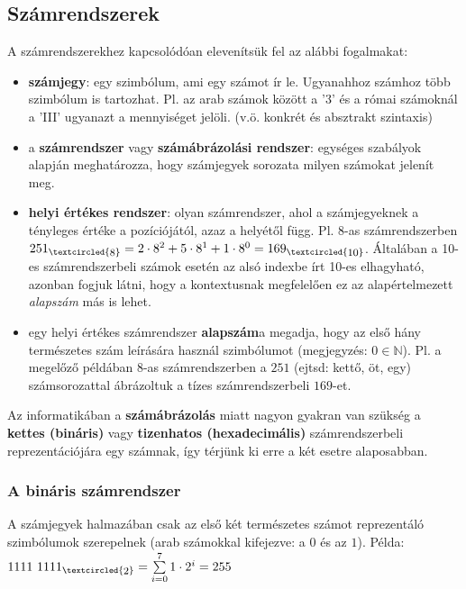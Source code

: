 \subsection{Számrendszerek}
A számrendszerekhez kapcsolódóan elevenítsük fel az alábbi fogalmakat:
\begin{itemize}
  \item \textbf{számjegy}: egy szimbólum, ami egy számot ír le. Ugyanahhoz számhoz több szimbólum is tartozhat. Pl. az arab számok között a '3' és a római számoknál a 'III' ugyanazt a mennyiséget jelöli. (v.ö. konkrét és absztrakt szintaxis)
  \item a \textbf{számrendszer} vagy \textbf{számábrázolási rendszer}: egységes szabályok alapján meghatározza, hogy számjegyek sorozata milyen számokat jelenít meg.
  \item \textbf{helyi értékes rendszer}: olyan számrendszer, ahol a számjegyeknek a tényleges értéke a pozíciójától, azaz a helyétől függ. Pl. 8-as számrendszerben $251_{\textcircled{\raisebox{-0.9pt}{\footnotesize{8}}}} =2 \cdot 8^2 + 5 \cdot 8^1 + 1 \cdot 8^0= 169_{\textcircled{\raisebox{-0.9pt}{\footnotesize{10}}}}$. Általában a 10-es számrendszerbeli számok esetén az alsó indexbe írt 10-es elhagyható, azonban fogjuk látni, hogy a kontextusnak megfelelően ez az alapértelmezett \textit{alapszám} más is lehet. 
  \item egy helyi értékes számrendszer \textbf{alapszám}a megadja, hogy az első hány természetes szám leírására használ szimbólumot (megjegyzés: $0 \in \mathbb{N}$). Pl. a megelőző példában 8-as számrendszerben a $251$ (ejtsd: kettő, öt, egy) számsorozattal ábrázoltuk a tízes számrendszerbeli $169$-et.
\end{itemize}
Az informatikában a \textbf{számábrázolás} miatt nagyon gyakran van szükség a \textbf{kettes (bináris)} vagy \textbf{tizenhatos (hexadecimális)} számrendszerbeli reprezentációjára egy számnak, így térjünk ki erre a két esetre alaposabban.

\subsubsection{A bináris számrendszer}
A számjegyek halmazában csak az első két természetes számot reprezentáló szimbólumok szerepelnek (arab számokkal kifejezve: a $0$ és az $1$). Példa:
$1111\ 1111_{\textcircled{\raisebox{-0.9pt}{\footnotesize{2}}}} = \sum\limits_{i=0}^7 1 \cdot 2^i = 255$ 

